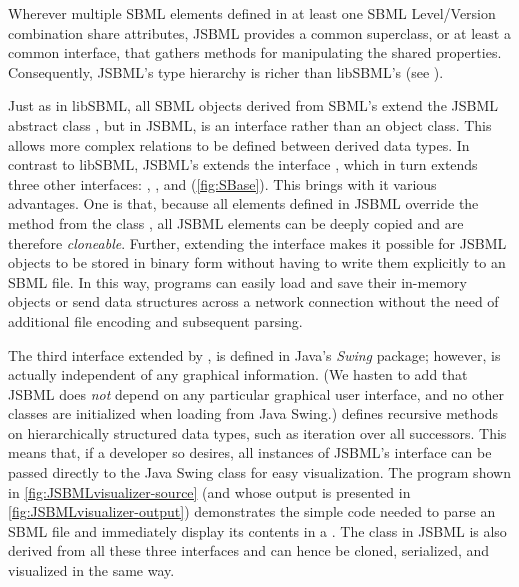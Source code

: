 Wherever multiple SBML elements defined in at least one SBML Level/Version
combination  share attributes, JSBML
 provides a common superclass, or at least a
common interface, that gathers methods for manipulating the shared
properties. Consequently, JSBML's type hierarchy  is richer than libSBML's (see
).

Just as in libSBML,  all
SBML objects derived from SBML's \SBase extend the JSBML abstract class
\SBase, but in JSBML, \SBase is an interface rather than an object class.
This allows more complex relations to be defined between derived data
types. In contrast to libSBML, JSBML's \SBase extends the interface
\TreeNodeWithChangeSupport, which in turn extends three other interfaces:
\Cloneable, \Serializable, and \TreeNode (\vref*{fig:SBase}).
This brings with it various advantages. One is that, because all elements
defined in JSBML  override the  method from
the class ,  all JSBML
elements can be deeply copied and are therefore \emph{cloneable}. Further,
extending the interface \Serializable makes it possible for JSBML
 objects to be stored in
binary form without having to write them explicitly to an SBML file.
 In this way, programs can easily load and save their
in-memory objects or send data structures across a network connection
without the need of additional file encoding and subsequent parsing.

The third interface extended by \SBase, \TreeNode is defined in Java's
\emph{Swing}  package; however,
\TreeNode is actually independent of any graphical information.  (We hasten
to add that JSBML does \emph{not} depend on any particular graphical user
interface, and no other classes are initialized when loading \TreeNode from
Java Swing.)  \TreeNode defines recursive methods on hierarchically
structured data types, such as iteration over all successors. This means
that, if a developer so desires, all instances of JSBML's \SBase interface
can be passed directly to the Java Swing  class \JTree {} for easy visualization. The program shown in
\vref{fig:JSBMLvisualizer-source} (and whose output is presented in
\vref{fig:JSBMLvisualizer-output}) demonstrates the simple code
needed to parse an SBML file  and immediately display
its contents in a \JFrame. 
The \ASTNode class in JSBML is also derived from all these three interfaces
and can hence be cloned, serialized, and visualized in the same way.

